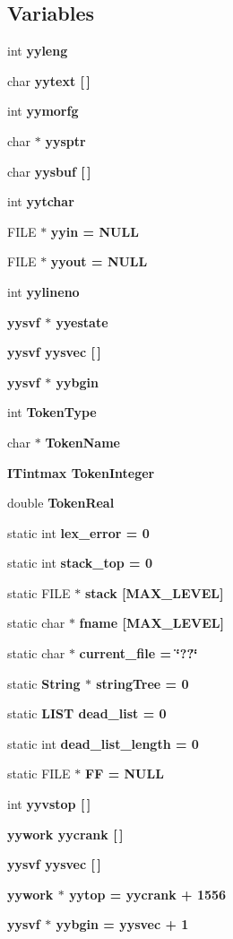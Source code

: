 \subsection*{Variables}
\begin{CompactItemize}
\item 
int \bf{yyleng}
\item 
char \bf{yytext} [$\,$]
\item 
int \bf{yymorfg}
\item 
char $\ast$ \bf{yysptr}
\item 
char \bf{yysbuf} [$\,$]
\item 
int \bf{yytchar}
\item 
FILE $\ast$ \bf{yyin} = NULL
\item 
FILE $\ast$ \bf{yyout} = NULL
\item 
int \bf{yylineno}
\item 
\bf{yysvf} $\ast$ \bf{yyestate}
\item 
\bf{yysvf} \bf{yysvec} [$\,$]
\item 
\bf{yysvf} $\ast$ \bf{yybgin}
\item 
int \bf{Token\-Type}
\item 
char $\ast$ \bf{Token\-Name}
\item 
\bf{ITintmax} \bf{Token\-Integer}
\item 
double \bf{Token\-Real}
\item 
static int \bf{lex\_\-error} = 0
\item 
static int \bf{stack\_\-top} = 0
\item 
static FILE $\ast$ \bf{stack} [MAX\_\-LEVEL]
\item 
static char $\ast$ \bf{fname} [MAX\_\-LEVEL]
\item 
static char $\ast$ \bf{current\_\-file} = \char`\"{}??\char`\"{}
\item 
static \bf{String} $\ast$ \bf{string\-Tree} = 0
\item 
static \bf{LIST} \bf{dead\_\-list} = 0
\item 
static int \bf{dead\_\-list\_\-length} = 0
\item 
static FILE $\ast$ \bf{FF} = NULL
\item 
int \bf{yyvstop} [$\,$]
\item 
\bf{yywork} \bf{yycrank} [$\,$]
\item 
\bf{yysvf} \bf{yysvec} [$\,$]
\item 
\bf{yywork} $\ast$ \bf{yytop} = \bf{yycrank} + 1556
\item 
\bf{yysvf} $\ast$ \bf{yybgin} = \bf{yysvec} + 1

\end{CompactItemize}
